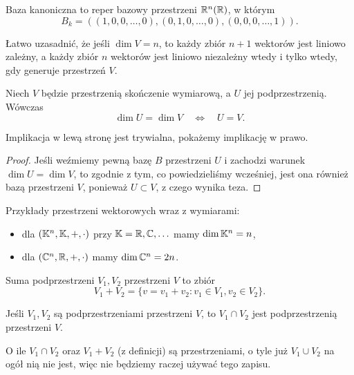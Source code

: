 \begin{definition}
    Baza kanoniczna to reper bazowy przestrzeni $\mathbb R^n(\mathbb R)$, w którym
    \[ B_k = \left((1,0,0,\ldots,0), (0,1,0,\ldots,0), (0,0,0,\ldots,1)\right). \]
\end{definition}

Łatwo uzasadnić, że jeśli $\dim V = n$, to każdy zbiór $n + 1$ wektorów jest liniowo zależny, a każdy zbiór $n$ wektorów jest liniowo niezależny wtedy i tylko wtedy, gdy generuje przestrzeń $V$.

\begin{theorem}
    \label{t:dimU = dimV, U subspace V}
    Niech $V$ będzie przestrzenią skończenie wymiarową, a $U$ jej podprzestrzenią. Wówczas
    \[ \dim U = \dim V \quad\iff\quad U = V. \]
\end{theorem}
Implikacja w lewą stronę jest trywialna, pokażemy implikację w prawo.
\begin{proof}
    Jeśli weźmiemy pewną bazę $B$ przestrzeni $U$ i zachodzi warunek $\dim U = \dim V$, to zgodnie z tym, co powiedzieliśmy wcześniej, jest ona również bazą przestrzeni $V$, ponieważ $U \subset V$, z czego wynika teza.
\end{proof}

\begin{example}
    Przykłady przestrzeni wektorowych wraz z wymiarami:
    \begin{itemize}
        \item dla $(\mathbb K^n, \mathbb K, +, \cdot)$ przy $\mathbb K = \mathbb R, \mathbb C, \ldots$ mamy $\dim \mathbb K^n = n$,
        \item dla $(\mathbb C^n, \mathbb R, +, \cdot)$ mamy $\dim \mathbb C^n = 2n$.
    \end{itemize}
\end{example}

\begin{definition}
    \label{d:sum of spaces}
    Suma podprzestrzeni $V_1, V_2$ przestrzeni $V$ to zbiór
    \[ V_1 + V_2 = \{v = v_1 + v_2 : v_1 \in V_1, v_2 \in V_2\}. \]
\end{definition}

\begin{fact}
    Jeśli $V_1, V_2$ są podprzestrzeniami przestrzeni $V$, to $V_1 \cap V_2$ jest podprzestrzenią przestrzeni $V$.
\end{fact}

\begin{remark}
    O ile $V_1 \cap V_2$ oraz $V_1 + V_2$ (z definicji) są przestrzeniami, o tyle już $V_1 \cup V_2$ na ogół nią nie jest, więc nie będziemy raczej używać tego zapisu.
\end{remark}

